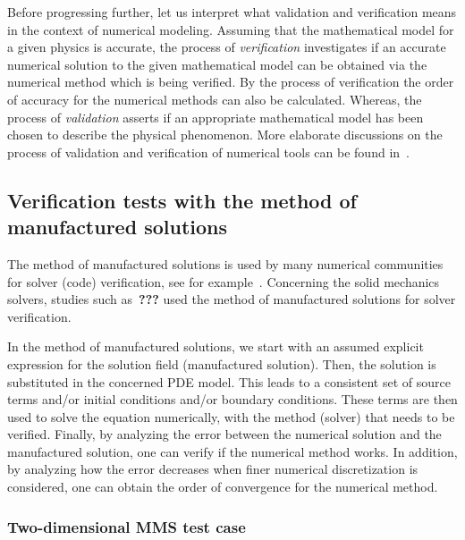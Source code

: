 Before progressing further, let us  interpret  what validation and verification means in the context of numerical modeling. Assuming that the mathematical model for a given physics is accurate, the process of \textit{verification}  investigates if an accurate numerical solution to the given mathematical model can be obtained via the numerical method which is being verified. By the process of verification the order of accuracy for the numerical methods can also be calculated. Whereas, the process of \textit{validation} asserts if an appropriate mathematical model has been chosen to describe the physical phenomenon. More elaborate discussions on the process of validation and verification of numerical tools can be found in~\cite{oberkampf2004verification}. 

	 
\subsection{Verification tests with the method of manufactured solutions }
The method of manufactured solutions is used by many numerical communities for solver (code) verification, see for example~\cite{roache1998verification,ecca2007verification,pautz2001verification}. Concerning the solid mechanics solvers, studies such as~\textbf{???} used the method of manufactured solutions for solver verification.

In the method of manufactured solutions, we start with an assumed explicit expression for the solution field (manufactured solution). Then, the solution is substituted  in the  concerned PDE model. This leads to a consistent set of source terms and/or initial conditions and/or boundary conditions. These terms are then used to solve the equation numerically, with the method (solver) that needs to be verified. Finally, by analyzing the error between the numerical solution and the manufactured solution, one can verify if the numerical method works. In addition, by analyzing how the error decreases when finer numerical discretization is considered, one can obtain the order of convergence for the numerical method. 

\subsubsection{Two-dimensional MMS test case}\label{SS:2dMMS}



